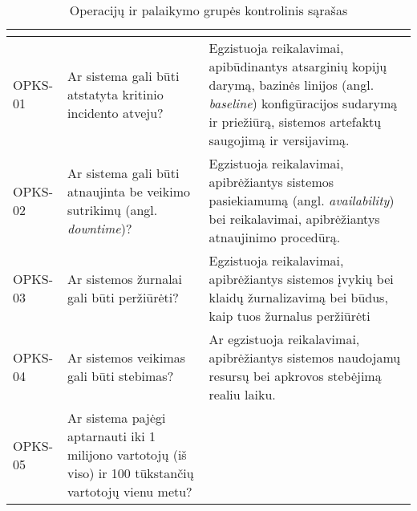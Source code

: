 \documentclass{VUMIFPSkursinis}
\begin{document}
\begin{center}
	\small
	\begin{longtable}{|C{2cm}|L{5cm}|L{8cm}|}
		\caption{Operacijų ir palaikymo grupės kontrolinis sąrašas}
		\label{table:EmployeeSalary}
		\\ \hline
		                                                         &
		                                             &
		\\ \hline
		OPKS-01                                                                                                 &
		Ar sistema gali būti atstatyta kritinio incidento atveju?                                               &
		Egzistuoja reikalavimai, apibūdinantys atsarginių kopijų darymą, bazinės linijos (angl. \textit{baseline}) konfigūracijos sudarymą ir priežiūrą, sistemos artefaktų saugojimą ir versijavimą. \\ \hline
		OPKS-02                                                                                                 &
		Ar sistema gali būti atnaujinta be veikimo sutrikimų (angl. \textit{downtime})?                         &
		Egzistuoja reikalavimai, apibrėžiantys sistemos pasiekiamumą (angl. \textit{availability}) bei reikalavimai, apibrėžiantys atnaujinimo procedūrą.                                             \\ \hline
		OPKS-03                                                                                                 &
		Ar sistemos žurnalai gali būti peržiūrėti?                                                              &
		Egzistuoja reikalavimai, apibrėžiantys sistemos įvykių bei klaidų žurnalizavimą bei būdus, kaip tuos žurnalus peržiūrėti                                                                      \\ \hline
		OPKS-04                                                                                                 &
		Ar sistemos veikimas gali būti stebimas?                                                                &
		Ar egzistuoja reikalavimai, apibrėžiantys sistemos naudojamų resursų bei apkrovos stebėjimą realiu laiku.                                                                                     \\ \hline
		OPKS-05                                                                                                 &
		Ar sistema pajėgi aptarnauti iki 1 milijono vartotojų (iš viso) ir 100 tūkstančių vartotojų vienu metu? &

\end{longtable}
\end{center}
\end{document}
